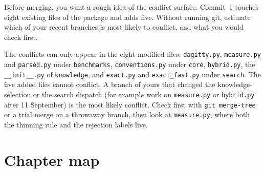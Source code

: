 \begin{exercicio}[metodo=estimation,conceito=quadro-observavel]
Before merging, you want a rough idea of the conflict surface. Commit~1 touches eight existing files
of the package and adds five. Without running git, estimate which of your recent branches is most
likely to conflict, and what you would check first.
\end{exercicio}
\begin{solucao}
The conflicts can only appear in the eight modified files: \texttt{dagitty.py}, \texttt{measure.py}
and \texttt{parsed.py} under \texttt{benchmarks}, \texttt{conventions.py} under \texttt{core},
\texttt{hybrid.py}, the \texttt{\_\_init\_\_.py} of \texttt{knowledge}, and \texttt{exact.py} and
\texttt{exact\_fast.py} under \texttt{search}. The five added files cannot conflict. A
branch of yours that changed the knowledge-selection or the search dispatch (for example work on
\texttt{measure.py} or \texttt{hybrid.py} after 11 September) is the most likely conflict. Check
first with \texttt{git merge-tree} or a trial merge on a throwaway branch, then look at
\texttt{measure.py}, where both the thinning rule and the rejection labels live.
\end{solucao}

\section*{Chapter map}

\begin{center}
\end{center}
